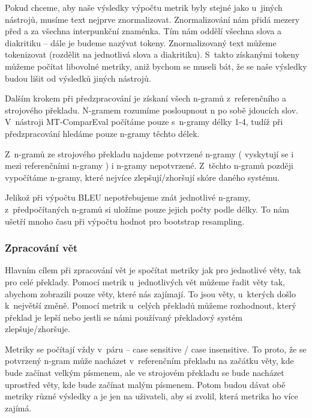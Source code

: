Pokud chceme,
  aby naše výsledky výpočtu metrik byly stejné jako u~jiných nástrojů,
  musíme text nejprve znormalizovat.
Znormalizování nám přidá mezery před a za všechna interpunkční znaménka.
Tím nám oddělí všechna slova a diakritiku -- dále je budeme nazývat tokeny.
Znormalizovaný text můžeme tokenizovat (rozdělit na jednotlivá slova a diakritiku).
S~takto získanými tokeny můžeme počítat libovolné metriky,
  aniž bychom se museli bát,
  že se naše výsledky budou lišit od výsledků jiných nástrojů.

Dalším krokem při předzpracování je získaní všech \mbox{n-gramů} z~referenčního a strojového překladu.
N-gramem rozumíme posloupnout n po sobě jdoucích slov.
V~nástroji MT-ComparEval počítáme pouze s~\mbox{n-gramy} délky 1-4,
  tudíž při předzpracování hledáme pouze \mbox{n-gramy} těchto délek. 

Z~\mbox{n-gramů} ze strojového překladu najdeme potvrzené \mbox{n-gramy}
  ( vyskytují se i mezi referenčními \mbox{n-gramy} )
  i \mbox{n-gramy} nepotvrzené.
Z~těchto \mbox{n-gramů} později vypočítáme \mbox{n-gramy},
  které nejvíce zlepšují/zhoršují skóre daného systému.
  
Jelikož při výpočtu BLEU nepotřebujeme znát jednotlivé \mbox{n-gramy},
  z~předpočítaných \mbox{n-gramů} si uložíme pouze jejich počty podle délky.
To nám ušetří mnoho času při výpočtu hodnot pro bootstrap resampling.

\subsubsection{Zpracování vět}
Hlavním cílem při zpracování vět je spočítat metriky jak pro jednotlivé věty,
  tak pro celé překlady.
Pomocí metrik u~jednotlivých vět můžeme řadit věty tak,
  abychom zobrazili pouze věty, 
  které nás zajímají.
To jsou věty, u~kterých došlo k~největší změně.
Pomocí metrik u~celých překladů můžeme rozhodnout,
  který překlad je lepší
  nebo jestli se námi používaný překladový systém zlepšuje/zhoršuje.

Metriky se počítají vždy v~páru -- case sensitive / case insensitive.
To proto, že se potvrzený \mbox{n-gram} může nacházet v~referenčním překladu na začátku věty,
  kde bude začínat velkým písmenem,
  ale ve strojovém překladu se bude nacházet uprostřed věty,
  kde bude začínat malým písmenem.
Potom budou dávat obě metriky různé výsledky 
  a je jen na uživateli,
  aby si zvolil, která metrika ho více zajímá.

